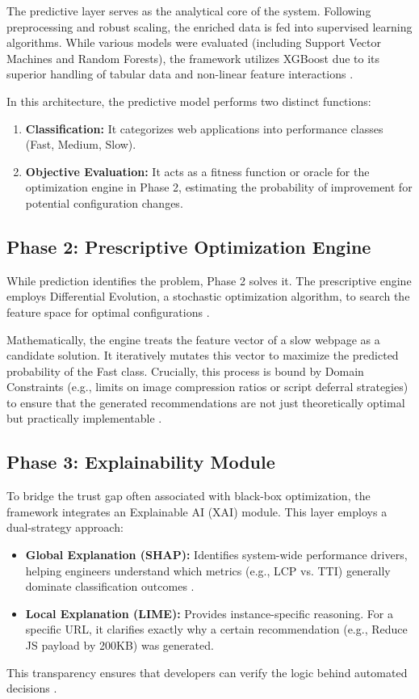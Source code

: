 \documentclass[sn-nature]{sn-jnl}
\begin{document}
The predictive layer serves as the analytical core of the system. Following preprocessing and robust scaling, the enriched data is fed into supervised learning algorithms. While various models were evaluated (including Support Vector Machines and Random Forests), the framework utilizes XGBoost due to its superior handling of tabular data and non-linear feature interactions \cite{xin2023}.

In this architecture, the predictive model performs two distinct functions:
\begin{enumerate}
    \item \textbf{Classification:} It categorizes web applications into performance classes (Fast, Medium, Slow).
    \item \textbf{Objective Evaluation:} It acts as a fitness function or oracle for the optimization engine in Phase 2, estimating the probability of improvement for potential configuration changes.
\end{enumerate}

\subsection{Phase 2: Prescriptive Optimization Engine}

While prediction identifies the problem, Phase 2 solves it. The prescriptive engine employs Differential Evolution, a stochastic optimization algorithm, to search the feature space for optimal configurations \cite{asha2025}.

Mathematically, the engine treats the feature vector of a slow webpage as a candidate solution. It iteratively mutates this vector to maximize the predicted probability of the Fast class. Crucially, this process is bound by Domain Constraints (e.g., limits on image compression ratios or script deferral strategies) to ensure that the generated recommendations are not just theoretically optimal but practically implementable \cite{goscien2025, surianarayanan2023}.

\subsection{Phase 3: Explainability Module}

To bridge the trust gap often associated with black-box optimization, the framework integrates an Explainable AI (XAI) module. This layer employs a dual-strategy approach:
\begin{itemize}
    \item \textbf{Global Explanation (SHAP):} Identifies system-wide performance drivers, helping engineers understand which metrics (e.g., LCP vs. TTI) generally dominate classification outcomes \cite{salih2024}.
    \item \textbf{Local Explanation (LIME):} Provides instance-specific reasoning. For a specific URL, it clarifies exactly why a certain recommendation (e.g., Reduce JS payload by 200KB) was generated.
\end{itemize}
This transparency ensures that developers can verify the logic behind automated decisions \cite{hassija2024, bennetot2024}.
\end{document}
